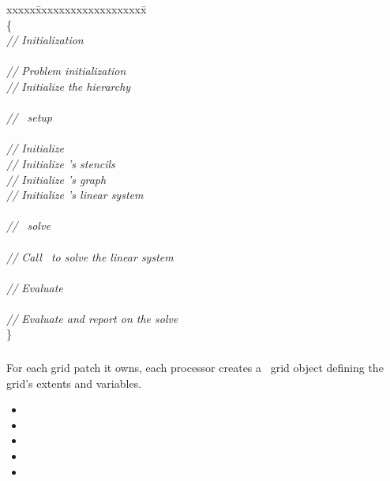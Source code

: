 \documentclass[10pt]{article}
\begin{document}
\begin{tabbing}
xxxxx\=xxxxxxxxxxxxxxxxxxx\=\kill
{} \\
\{ \\
\> \textit{// Initialization} \\
\\
\>  \> \textit{// Problem initialization} \\
\>  \> \textit{// Initialize the hierarchy} \\
\\
\> \textit{// \hypre\ setup} \\
\\
\>  \> \textit{// Initialize \hypre} \\
\>  \> \textit{// Initialize \hypre's stencils} \\
\>  \> \textit{// Initialize \hypre's graph} \\
\>  \> \textit{// Initialize \hypre's linear system} \\
\\
\> \textit{// \hypre\ solve} \\
\\
\>  \> \textit{// Call \hypre\ to solve the linear system} \\
\\
\> \textit{// Evaluate} \\
\\
\>  \> \textit{// Evaluate and report on the solve} \\
\}
\end{tabbing}

\subsubsection{}


For each grid patch it owns, each processor creates a \hypre\ grid
object defining the grid's extents and variables.  

\begin{itemize}
\item {}
\item {}
\item {}
\item {}
\item {}
\end{itemize}
\end{document}
